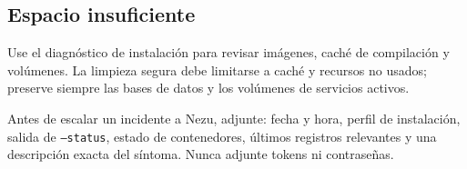 \subsection{Espacio insuficiente}
Use el diagnóstico de instalación para revisar imágenes, caché de compilación y volúmenes. La limpieza segura debe limitarse a caché y recursos no usados; preserve siempre las bases de datos y los volúmenes de servicios activos.

\begin{tcolorbox}[title=Escalación]
Antes de escalar un incidente a Nezu, adjunte: fecha y hora, perfil de instalación, salida de \texttt{--status}, estado de contenedores, últimos registros relevantes y una descripción exacta del síntoma. Nunca adjunte tokens ni contraseñas.
\end{tcolorbox}
